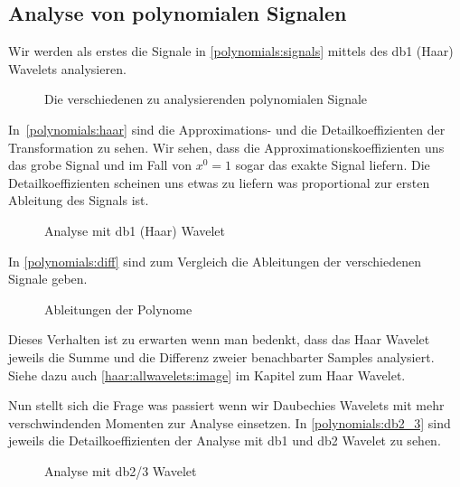 \begin{refsection}
\section{Analyse von polynomialen Signalen}

Wir werden als erstes die Signale in \autoref{polynomials:signals} mittels des db1
(Haar) Wavelets analysieren.

\begin{figure}
    \centering
    
    \caption{Die verschiedenen zu analysierenden polynomialen Signale\label{polynomials:signals}}
\end{figure}

In~\autoref{polynomials:haar} sind die Approximations- und die Detailkoeffizienten
der Transformation zu sehen. Wir sehen, dass die Approximationskoeffizienten
uns das grobe Signal und im Fall von $x^0 = 1$ sogar das exakte Signal liefern. Die
Detailkoeffizienten scheinen uns etwas zu liefern was proportional zur ersten
Ableitung des Signals ist.

\begin{figure}
    \centering
    
    \caption{Analyse mit db1 (Haar) Wavelet\label{polynomials:haar}}
\end{figure}

In \autoref{polynomials:diff} sind zum Vergleich die Ableitungen der
verschiedenen Signale geben.

\begin{figure}
    \centering
    
    \caption{Ableitungen der Polynome\label{polynomials:diff}}
\end{figure}

Dieses Verhalten ist zu erwarten wenn man bedenkt, dass das Haar Wavelet
jeweils die Summe und die Differenz zweier benachbarter Samples analysiert.
Siehe dazu auch \autoref{haar:allwavelets:image} im Kapitel zum Haar Wavelet.

Nun stellt sich die Frage was passiert wenn wir Daubechies Wavelets mit mehr
verschwindenden Momenten zur Analyse einsetzen. In \autoref{polynomials:db2_3}
sind jeweils die Detailkoeffizienten der Analyse mit db1 und db2 Wavelet zu
sehen.

\begin{figure}
    \centering
    
    \caption{Analyse mit db2/3 Wavelet\label{polynomials:db2_3}}
\end{figure}


\end{refsection}

